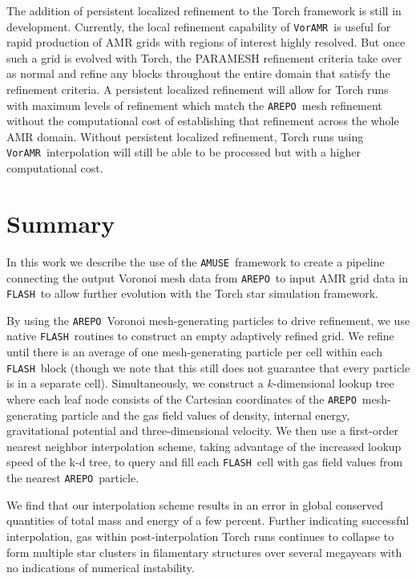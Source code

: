 \documentclass[twoside]{drexel-thesis}
\newcommand\voramr{\texttt{VorAMR}}
\newcommand\flash{\texttt{FLASH}}
\newcommand\amuse{\texttt{AMUSE}}
\newcommand\arepo{\texttt{AREPO}}
\begin{document}
\begin{thesis}
The addition of persistent localized refinement to the Torch framework is still in development. Currently, the local refinement capability of \voramr~is useful for rapid production of AMR grids with regions of interest highly resolved. But once such a grid is evolved with Torch, the PARAMESH refinement criteria take over as normal and refine any blocks throughout the entire domain that satisfy the refinement criteria. A persistent localized refinement will allow for Torch runs with maximum levels of refinement which match the \arepo~mesh refinement without the computational cost of establishing that refinement across the whole AMR domain. Without persistent localized refinement, Torch runs using \voramr~interpolation will still be able to be processed but with a higher computational cost.

\section{Summary}
In this work we describe the use of the \amuse~framework to create a pipeline connecting the output Voronoi mesh data from \arepo~to input AMR grid data in \flash~to allow further evolution with the Torch star simulation framework. 

By using the \arepo~Voronoi mesh-generating particles to drive refinement, we use native \flash~routines to construct an empty adaptively refined grid.  We refine until there is an average of one mesh-generating particle per cell within each \flash~block (though we note that this still does not guarantee that every particle is in a separate cell). Simultaneously, we construct a $k$-dimensional lookup tree where each leaf node consists of the Cartesian coordinates of the \arepo~mesh-generating particle and the gas field values of density, internal energy, gravitational potential and three-dimensional velocity. We then use a first-order nearest neighbor interpolation scheme, taking advantage of the increased lookup speed of the k-d tree, to query and fill each \flash~cell with gas field values from the nearest \arepo~particle.

We find that our interpolation scheme results in an error in global conserved quantities of total mass and energy of a few percent. Further indicating successful interpolation, gas within post-interpolation Torch runs continues to collapse to form multiple star clusters in filamentary structures over several megayears with no indications of numerical instability.


\end{thesis}
\end{document}
